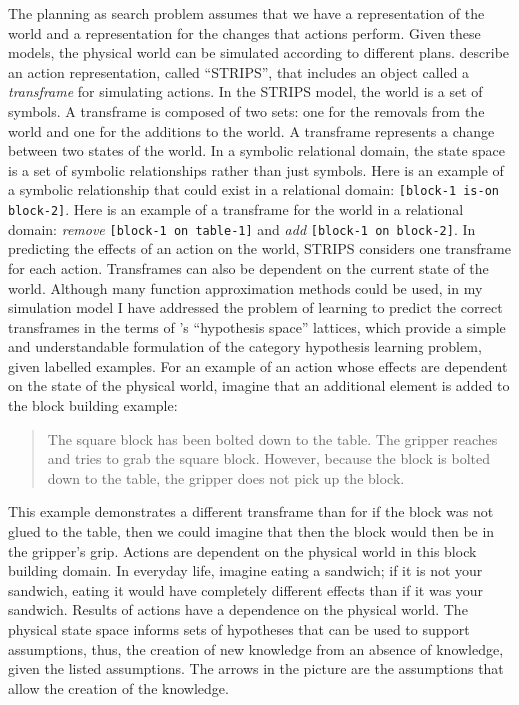 The planning as search problem assumes that we have a representation
of the world and a representation for the changes that actions
perform.  Given these models, the physical world can be simulated
according to different plans.  \cite{fikes:1972} describe an action
representation, called ``STRIPS'', that includes an object called a
\emph{transframe} for simulating actions.  In the STRIPS model, the
world is a set of symbols.  A transframe is composed of two sets: one
for the removals from the world and one for the additions to the
world.  A transframe represents a change between two states of the
world.  In a symbolic relational domain, the state space is a set of
symbolic relationships rather than just symbols.  Here is an example
of a symbolic relationship that could exist in a relational domain:
{\tt [block-1 is-on block-2]}.  Here is an example of a transframe for
the world in a relational domain: \emph{remove} {\tt [block-1 on
    table-1]} and \emph{add} {\tt [block-1 on block-2]}.  In
predicting the effects of an action on the world, STRIPS considers one
transframe for each action.  Transframes can also be dependent on the
current state of the world.  Although many function approximation
methods could be used, in my simulation model I have addressed the
problem of learning to predict the correct transframes in the terms of
\cite{mitchell:1982}'s ``hypothesis space'' lattices, which provide a
simple and understandable formulation of the category hypothesis
learning problem, given labelled examples.  For an example of an
action whose effects are dependent on the state of the physical world,
imagine that an additional element is added to the block building
example:
\begin{quote}
The square block has been bolted down to the table.  The gripper
reaches and tries to grab the square block.  However, because the
block is bolted down to the table, the gripper does not pick up the
block.
\end{quote}

This example demonstrates a different transframe than for if the block
was not glued to the table, then we could imagine that then the block
would then be in the gripper's grip.  Actions are dependent on the
physical world in this block building domain.  In everyday life,
imagine eating a sandwich; if it is not your sandwich, eating it would
have completely different effects than if it was your sandwich.
Results of actions have a dependence on the physical world.  The
physical state space informs sets of hypotheses that can be used to
support assumptions, thus, the creation of new knowledge from an
absence of knowledge, given the listed assumptions.  The arrows in the
picture are the assumptions that allow the creation of the knowledge.

